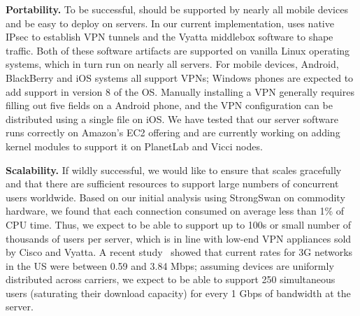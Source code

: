 \noindent\textbf{Portability.} To be successful, \meddle should be
supported by nearly all mobile devices and be easy to deploy on
servers. In our current implementation, \meddle uses native IPsec to
establish VPN tunnels and the Vyatta middlebox software to shape
traffic. Both of these software artifacts are supported on vanilla
Linux operating systems, which in turn run on nearly all servers. For
mobile devices, Android, BlackBerry and iOS systems all support VPNs;
Windows phones are expected to add support in version 8 of the
OS. Manually installing a VPN generally requires filling out five
fields on a Android phone, and the VPN configuration can be
distributed using a single file on iOS. We have tested that our server
software runs correctly on Amazon's EC2 offering and are currently
working on adding kernel modules to support it on PlanetLab and Vicci
nodes.

\noindent\textbf{Scalability.} If wildly successful, we would like to
ensure that \meddle scales gracefully and that there are sufficient
resources to support large numbers of concurrent users
worldwide. Based on our initial analysis using StrongSwan on commodity
hardware, we found that each connection consumed on average less than
1\% of CPU time. Thus, we expect to be able to support up to 100s or
small number of thousands of users per server, which is in line with
low-end VPN appliances sold by Cisco and Vyatta. A recent
study~\cite{pcworld-speedtests} showed that current rates for 3G
networks in the US were between 0.59 and 3.84 Mbps; assuming devices
are uniformly distributed across carriers, we expect to be able to
support 250 simultaneous users (saturating their download capacity)
for every 1 Gbps of bandwidth at the server.



